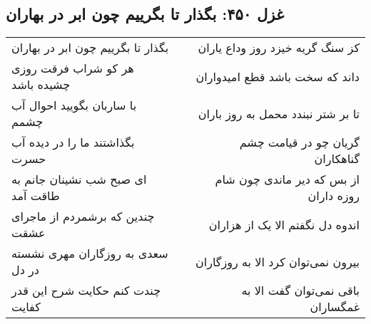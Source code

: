 \begin{center}
\section*{غزل ۴۵۰: بگذار تا بگرییم چون ابر در بهاران}
\label{sec:450}
\begin{longtable}{l p{0.5cm} r}
بگذار تا بگرییم چون ابر در بهاران
&&
کز سنگ گریه  خیزد روز وداع یاران
\\
هر کو شراب فرقت روزی چشیده باشد
&&
داند که سخت باشد قطع امیدواران
\\
با ساربان بگویید احوال آب چشمم
&&
تا بر شتر نبندد محمل به روز باران
\\
بگذاشتند ما را در دیده آب حسرت
&&
گریان چو در قیامت چشم گناهکاران
\\
ای صبح شب نشینان جانم به طاقت آمد
&&
از بس که دیر ماندی چون شام روزه داران
\\
چندین که برشمردم از ماجرای عشقت
&&
اندوه دل نگفتم الا یک از هزاران
\\
سعدی به روزگاران مهری نشسته در دل
&&
بیرون نمی‌توان کرد الا به روزگاران
\\
چندت کنم حکایت شرح این قدر کفایت
&&
باقی نمی‌توان گفت الا به غمگساران
\\
\end{longtable}
\end{center}
